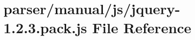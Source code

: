 \hypertarget{manual_2js_2jquery-1_82_83_8pack_8js}{\section{parser/manual/js/jquery-\/1.2.3.pack.\+js File Reference}
\label{manual_2js_2jquery-1_82_83_8pack_8js}
}
